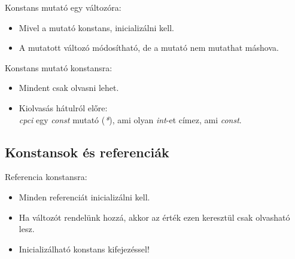 \documentclass[usenames,dvipsnames,aspectratio=169]{beamer}
\begin{document}
\begin{frame}
    Konstans mutató egy változóra:
    \begin{itemize}
        \item Mivel a mutató konstans, inicializálni kell.
        \item A mutatott változó módosítható, de a mutató nem mutathat máshova.
    \end{itemize}
    \begin{exampleblock}{}
        \scriptsize
        
    \end{exampleblock}
\end{frame}

\begin{frame}
    Konstans mutató konstansra:
    \begin{itemize}
        \item Mindent csak olvasni lehet.
        \item Kiolvasás hátulról előre:\\ \emph{cpci} egy \emph{const} mutató (\emph{*}), ami olyan \emph{int}-et címez, ami \emph{const}.
    \end{itemize}
    \begin{exampleblock}{}
        \scriptsize
        
    \end{exampleblock}
\end{frame}

\subsection{Konstansok és referenciák}

\begin{frame}
    Referencia konstansra:
    \begin{itemize}
        \item Minden referenciát inicializálni kell.
        \item Ha változót rendelünk hozzá, akkor az érték ezen keresztül csak olvasható lesz.
        \item Inicializálható konstans kifejezéssel!
    \end{itemize}
    \begin{exampleblock}{}
        \scriptsize
        
    \end{exampleblock}
\end{frame}
\end{document}
